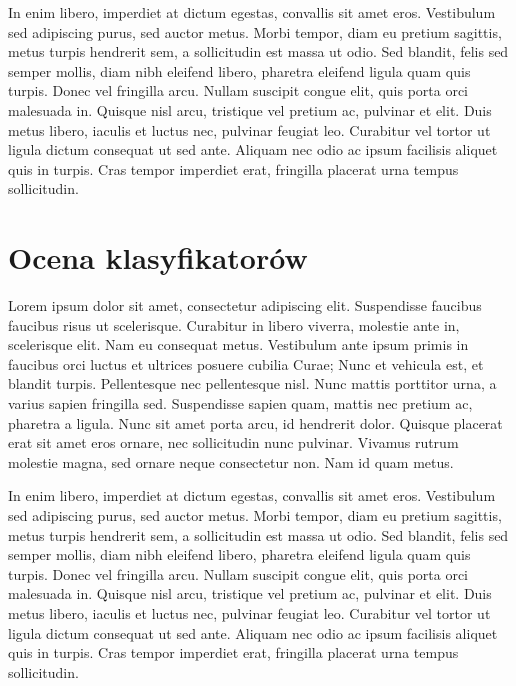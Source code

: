 	In enim libero, imperdiet at dictum egestas, convallis sit amet eros. Vestibulum sed adipiscing purus, sed auctor metus. Morbi tempor, diam eu pretium sagittis, metus turpis hendrerit sem, a sollicitudin est massa ut odio. Sed blandit, felis sed semper mollis, diam nibh eleifend libero, pharetra eleifend ligula quam quis turpis. Donec vel fringilla arcu. Nullam suscipit congue elit, quis porta orci malesuada in. Quisque nisl arcu, tristique vel pretium ac, pulvinar et elit. Duis metus libero, iaculis et luctus nec, pulvinar feugiat leo. Curabitur vel tortor ut ligula dictum consequat ut sed ante. Aliquam nec odio ac ipsum facilisis aliquet quis in turpis. Cras tempor imperdiet erat, fringilla placerat urna tempus sollicitudin.
	
\section{Ocena klasyfikatorów}
Lorem ipsum dolor sit amet, consectetur adipiscing elit. Suspendisse faucibus faucibus risus ut scelerisque. Curabitur in libero viverra, molestie ante in, scelerisque elit. Nam eu consequat metus. Vestibulum ante ipsum primis in faucibus orci luctus et ultrices posuere cubilia Curae; Nunc et vehicula est, et blandit turpis. Pellentesque nec pellentesque nisl. Nunc mattis porttitor urna, a varius sapien fringilla sed. Suspendisse sapien quam, mattis nec pretium ac, pharetra a ligula. Nunc sit amet porta arcu, id hendrerit dolor. Quisque placerat erat sit amet eros ornare, nec sollicitudin nunc pulvinar. Vivamus rutrum molestie magna, sed ornare neque consectetur non. Nam id quam metus.

In enim libero, imperdiet at dictum egestas, convallis sit amet eros. Vestibulum sed adipiscing purus, sed auctor metus. Morbi tempor, diam eu pretium sagittis, metus turpis hendrerit sem, a sollicitudin est massa ut odio. Sed blandit, felis sed semper mollis, diam nibh eleifend libero, pharetra eleifend ligula quam quis turpis. Donec vel fringilla arcu. Nullam suscipit congue elit, quis porta orci malesuada in. Quisque nisl arcu, tristique vel pretium ac, pulvinar et elit. Duis metus libero, iaculis et luctus nec, pulvinar feugiat leo. Curabitur vel tortor ut ligula dictum consequat ut sed ante. Aliquam nec odio ac ipsum facilisis aliquet quis in turpis. Cras tempor imperdiet erat, fringilla placerat urna tempus sollicitudin.

